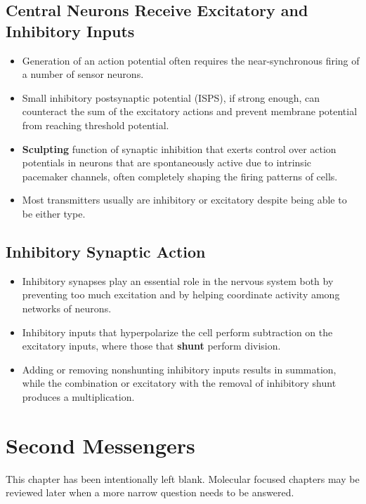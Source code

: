 \documentclass[12pt,a4paper]{article}
\begin{document}
\subsection{Central Neurons Receive Excitatory and Inhibitory Inputs}
\begin{itemize}
    \item Generation of an action potential often requires the near-synchronous firing of a number of sensor neurons.
    \item Small inhibitory postsynaptic potential (ISPS), if strong enough, can counteract the sum of the excitatory actions and prevent membrane potential from reaching threshold potential.
    \item \textbf{Sculpting} function of synaptic inhibition that exerts control over action potentials in neurons that are spontaneously active due to intrinsic pacemaker channels, often completely shaping the firing patterns of cells.
    \item Most transmitters usually are inhibitory or excitatory despite being able to be either type. 
\end{itemize}

\subsection{Inhibitory Synaptic Action}
\begin{itemize}
    \item Inhibitory synapses play an essential role in the nervous system both by preventing too much excitation and by helping coordinate activity among networks of neurons. 
    \item Inhibitory inputs that hyperpolarize the cell perform subtraction on the excitatory inputs, where those that \textbf{shunt} perform division. 
    \item Adding or removing nonshunting inhibitory inputs results in summation, while the combination or excitatory with the removal of inhibitory shunt produces a multiplication.
\end{itemize}




\clearpage
\section{Second Messengers}
    This chapter has been intentionally left blank. Molecular focused chapters may be reviewed later when a more narrow question needs to be answered.
\end{document}
